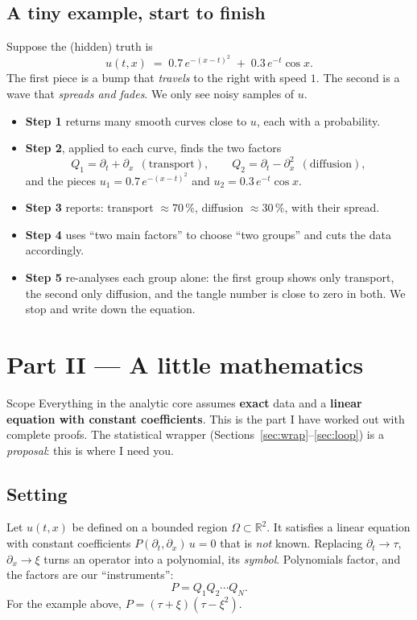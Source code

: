 \documentclass[11pt,a4paper]{article}
\newcommand{\R}{\mathbb R}
\begin{document}
\subsection*{A tiny example, start to finish}
Suppose the (hidden) truth is
\[
u(t,x)\;=\;0.7\,e^{-(x-t)^2}\;+\;0.3\,e^{-t}\cos x .
\]
The first piece is a bump that \emph{travels} to the right with speed $1$. The second is a wave that \emph{spreads and fades}. We only see noisy samples of $u$.
\begin{itemize}[nosep]
\item \textbf{Step 1} returns many smooth curves close to $u$, each with a probability.
\item \textbf{Step 2}, applied to each curve, finds the two factors
\[
Q_1=\partial_t+\partial_x\ \ (\text{transport}),\qquad Q_2=\partial_t-\partial_x^2\ \ (\text{diffusion}),
\]
and the pieces $u_1=0.7\,e^{-(x-t)^2}$ and $u_2=0.3\,e^{-t}\cos x$.
\item \textbf{Step 3} reports: transport $\approx 70\,\%$, diffusion $\approx 30\,\%$, with their spread.
\item \textbf{Step 4} uses ``two main factors'' to choose ``two groups'' and cuts the data accordingly.
\item \textbf{Step 5} re-analyses each group alone: the first group shows only transport, the second only diffusion, and the tangle number is close to zero in both. We stop and write down the equation.
\end{itemize}

\section*{Part II --- A little mathematics}

\begin{notebox}{Scope}
Everything in the analytic core assumes \textbf{exact} data and a \textbf{linear equation with constant coefficients}. This is the part I have worked out with complete proofs. The statistical wrapper (Sections~\ref{sec:wrap}--\ref{sec:loop}) is a \emph{proposal}: this is where I need you.
\end{notebox}

\subsection{Setting}
Let $u(t,x)$ be defined on a bounded region $\Omega\subset\R^2$. It satisfies a linear equation with constant coefficients $P(\partial_t,\partial_x)\,u=0$ that is \emph{not} known. Replacing $\partial_t\to\tau$, $\partial_x\to\xi$ turns an operator into a polynomial, its \emph{symbol}. Polynomials factor, and the factors are our ``instruments'':
\[
P=Q_1Q_2\cdots Q_N .
\]
For the example above, $P=(\tau+\xi)(\tau-\xi^2)$.
\end{document}
